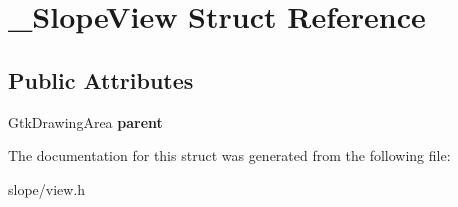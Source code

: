 \hypertarget{struct__SlopeView}{\section{\+\_\+\+Slope\+View Struct Reference}
\label{struct__SlopeView}
}
\subsection*{Public Attributes}
\begin{DoxyCompactItemize}
\item 
\hypertarget{struct__SlopeView_ae74ce5afc47d1f5d2aa1bb45f822377c}{Gtk\+Drawing\+Area {\bfseries parent}}\label{struct__SlopeView_ae74ce5afc47d1f5d2aa1bb45f822377c}

\end{DoxyCompactItemize}


The documentation for this struct was generated from the following file\+:\begin{DoxyCompactItemize}
\item 
slope/view.\+h\end{DoxyCompactItemize}
